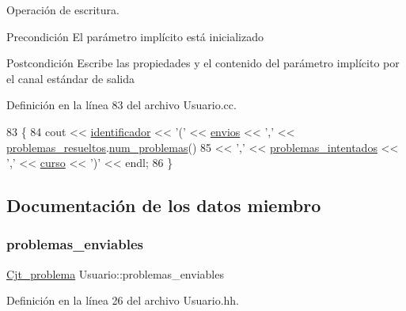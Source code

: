 Operación de escritura. 

\begin{DoxyPrecond}{Precondición}
El parámetro implícito está inicializado 
\end{DoxyPrecond}
\begin{DoxyPostcond}{Postcondición}
Escribe las propiedades y el contenido del parámetro implícito por el canal estándar de salida 
\end{DoxyPostcond}


Definición en la línea 83 del archivo Usuario.\+cc.


\begin{DoxyCode}
83                                \{
84   cout << \mbox{\hyperlink{class_usuario_a95926ccb5e92ec5f2acab98830a3725e}{identificador}} << \textcolor{charliteral}{'('} << \mbox{\hyperlink{class_usuario_a485a741c0646e6414bd6cf669a77fc9c}{envios}} << \textcolor{charliteral}{','} << 
      \mbox{\hyperlink{class_usuario_a53fa260ffc780dd5c3a4805d683e5ee7}{problemas\_resueltos}}.\mbox{\hyperlink{class_cjt__problema_acf0fca6955f991a9debb4ef50ece8905}{num\_problemas}}()
85   << \textcolor{charliteral}{','} << \mbox{\hyperlink{class_usuario_a5484a08ce9aeabef98074c738f58b00a}{problemas\_intentados}} << \textcolor{charliteral}{','} << \mbox{\hyperlink{class_usuario_aa767fe2d1198f2c97791073bc55803e7}{curso}} << \textcolor{charliteral}{')'} << endl;
86 \}
\end{DoxyCode}


\subsection{Documentación de los datos miembro}
\mbox{\label{class_usuario_a553cef1aad192b30d010cd524f261c1b}} 
\subsubsection{\texorpdfstring{problemas\+\_\+enviables}{problemas\_enviables}}
{\footnotesize\ttfamily \mbox{\hyperlink{class_cjt__problema}{Cjt\+\_\+problema}} Usuario\+::problemas\+\_\+enviables\hspace{0.3cm}{\ttfamily [private]}}



Definición en la línea 26 del archivo Usuario.\+hh.


